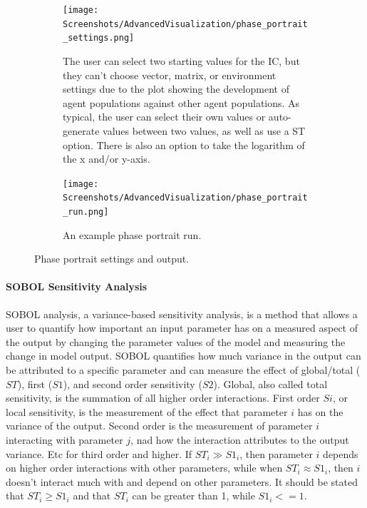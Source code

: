 \begin{figure}[h!]
    \centering
    \begin{subfigure}{0.49\linewidth}
        \centering
        \captionsetup{width=1\linewidth}
        \texttt{[image: Screenshots/AdvancedVisualization/phase\_portrait\_settings.png]}
        \caption{
            The user can select two starting values for the IC, but they can't choose vector, matrix, or environment settings due to the plot showing the development of agent populations against other agent populations.
            As typical, the user can select their own values or auto-generate values between two values, as well as use a ST option.
            There is also an option to take the logarithm of the x and/or y-axis. 
        }
        \label{fig:ss:av:phase_portrait_settings}
    \end{subfigure}
    \hfill
    \begin{subfigure}{0.49\linewidth}
        \centering
        \captionsetup{width=1\linewidth}
        \texttt{[image: Screenshots/AdvancedVisualization/phase\_portrait\_run.png]}
        \caption{
            An example phase portrait run. 
        }
        \label{fig:ss:av:phase_portrait_run}
    \end{subfigure}
    \caption{Phase portrait settings and output. }
\end{figure}

\paragraph{SOBOL Sensitivity Analysis}
\label{sec:SOBOL_sensitivity_analysis}
SOBOL analysis, a variance-based sensitivity analysis, is a method that allows a user to quantify how important an input parameter has on a measured aspect of the output by changing the parameter values of the model and measuring the change in model output.
SOBOL quantifies how much variance in the output can be attributed to a specific parameter and can measure the effect of global/total ($ST$), first ($S1$), and second order sensitivity ($S2$). 
Global, also called total sensitivity, is the summation of all higher order interactions. 
First order $Si$, or local sensitivity, is the measurement of the effect that parameter $i$ has on the variance of the output. 
Second order is the measurement of parameter $i$ interacting with parameter $j$, nad how the interaction attributes to the output variance. 
Etc for third order and higher. 
If $ST_i \gg S1_i$, then parameter $i$ depends on higher order interactions with other parameters, while when $ST_i \approx S1_i$, then $i$ doesn't interact much with and depend on other parameters.
It should be stated that $ST_i \geq S1_i$ and that $ST_i$ can be greater than 1, while $S1_i <= 1$. 

